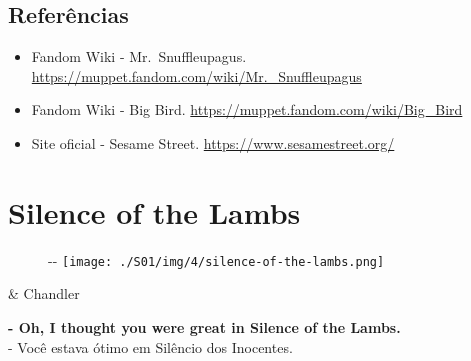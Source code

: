 \hypertarget{referuxeancias-4}{%
\subsection{Referências}\label{referuxeancias-4}}

\begin{itemize}
\tightlist
\item
  \sloppy Fandom Wiki - Mr. Snuffleupagus. \url{https://muppet.fandom.com/wiki/Mr._Snuffleupagus}
\item
  \sloppy Fandom Wiki - Big Bird. \url{https://muppet.fandom.com/wiki/Big_Bird}
\item
  \sloppy Site oficial - Sesame Street. \url{https://www.sesamestreet.org/}
\end{itemize}

\hypertarget{silence-of-the-lambs}{%
\section{Silence of the Lambs}\label{silence-of-the-lambs}}

\begin{figure}[!ht]
  \begin{adjustwidth}{-\oddsidemargin-1in}{-\rightmargin}
    \centering
    \texttt{[image: ./S01/img/4/silence-of-the-lambs.png]}
  \end{adjustwidth}
\end{figure}

\begin{tcolorbox}[enhanced,center upper,
    drop fuzzy shadow southeast, boxrule=0.3pt,
    lower separated=false,
    colframe=black!30!dialogoBorder,colback=white]
\begin{minipage}[c]{0.16\linewidth}
   & \centering \scriptsize{Chandler}
\end{minipage}
\hfill
\begin{minipage}[c]{0.8\linewidth}
  \textbf{- Oh, I thought you were great in Silence of the Lambs.}\\
  - Você estava ótimo em Silêncio dos Inocentes.
\end{minipage}
\end{tcolorbox}

